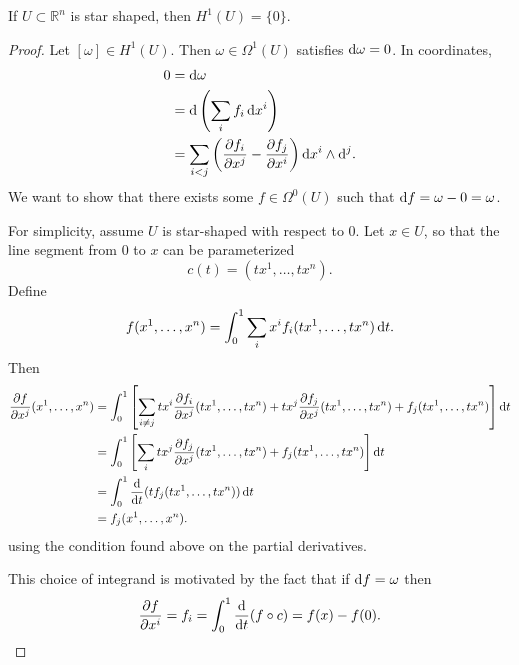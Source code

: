 \begin{lemma}
If $U \subset \mathbb{R}^n$ is star shaped, then $H^1(U) = \{ 0 \}$.
\end{lemma}
\begin{proof}
Let $[\omega] \in H^1(U)$. Then $\omega \in \Omega^1(U)$ satisfies
$\mathop{}\!\mathrm{d} \omega = 0$. In coordinates,
\begin{align*}
   0
&= \mathop{}\!\mathrm{d} \omega \\
&= \mathop{}\!\mathrm{d} \left(\sum_i f_i \mathop{}\!\mathrm{d} x^i\right) \\
&= \sum_{i < j}
     \left(
       \frac{\partial f_i}{\partial x^j}
     - \frac{\partial f_j}{\partial x^i}
    \right)
    \mathop{}\!\mathrm{d} x^i \wedge \mathop{}\!\mathrm{d}^j.
\end{align*}
We want to show that there exists some
$f \in \Omega^0(U)$ such that
$\mathop{}\!\mathrm{d} f = \omega - 0 = \omega$.

For simplicity, assume $U$ is star-shaped with respect to 0.
Let $x \in U$, so that the line segment from 0 to $x$ can be
parameterized
$$
  c(t)
= (t x^1, \dots, t x^n).
$$
Define
$$
  f(x^1, \dots, x^n)
= \int_0^1
    \sum_i
      x^i f_i(tx^1, \dots, tx^n)
      \mathop{}\!\mathrm{d} t.
$$
Then
\begin{align*}
   \frac{\partial f}
        {\partial x^j}
   (x^1, \dots, x^n)
&= \int_0^1
     \left[
       \sum_{i \neq j}
         tx^i
         \frac{\partial f_i}
              {\partial x^j}
         (tx^1, \dots, tx^n)
     + tx^j
         \frac{\partial f_j}
              {\partial x^j}
         (tx^1, \dots, tx^n)
     + f_j(tx^1, \dots, tx^n)
     \right]
     \mathop{}\!\mathrm{d} t \\
&= \int_0^1
     \left[
       \sum_i
         tx^j
         \frac{\partial f_j}
              {\partial x^j}
         (tx^1, \dots, tx^n)
     + f_j(tx^1, \dots, tx^n)
     \right]
     \mathop{}\!\mathrm{d} t \\
&= \int_0^1
     \frac{\mathop{}\!\mathrm{d}}{\mathop{}\!\mathrm{d} t}
       (t f_j(tx^1, \dots, tx^n))
     \mathop{}\!\mathrm{d} t \\
&= f_j(x^1, \dots, x^n).
\end{align*}
using the condition found above on the partial derivatives.

This choice of integrand is motivated by the fact that if $\mathop{}\!\mathrm{d} f =
\omega$ then
$$
  \frac{\partial f}{\partial x^i}
= f_i
= \int_0^1 \frac{\mathop{}\!\mathrm{d}}{\mathop{}\!\mathrm{d} t}(f \circ c)
= f(x) - f(0).
$$
\end{proof}

